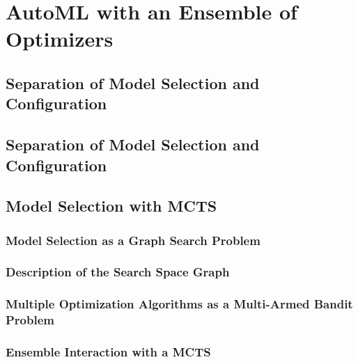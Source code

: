 %
\chapter{AutoML with an Ensemble of Optimizers}
\label{sec:approach}

\Blindtext

\section{Separation of Model Selection and Configuration}
\label{sec:approach:separation}

\Blindtext

\section{Separation of Model Selection and Configuration}
\label{sec:approach:separation}

\Blindtext

\section{Model Selection with MCTS}
\label{sec:approach:selection}

\Blindtext

\subsection{Model Selection as a Graph Search Problem}
\label{sec:appraoch:selection:search}

\Blindtext

\subsection{Description of the Search Space Graph}
\label{sec:appraoch:selection:graph}

\Blindtext

\subsection{Multiple Optimization Algorithms as a Multi-Armed Bandit Problem}
\label{sec:appraoch:selection:bandit}

\Blindtext

\subsection{Ensemble Interaction with a MCTS}
\label{sec:appraoch:selection:mcts}

